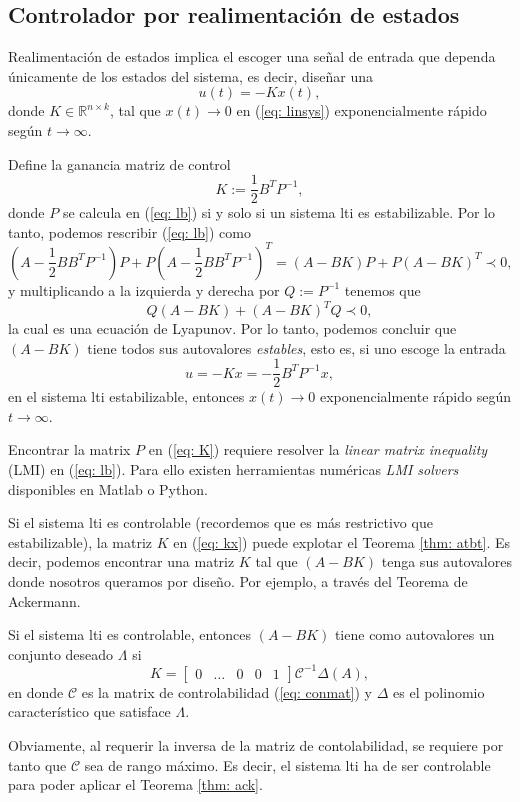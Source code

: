 \subsection{Controlador por realimentación de estados}
Realimentación de estados implica el escoger una señal de entrada que dependa únicamente de los estados del sistema, es decir, diseñar una
\begin{equation}
u(t) = -Kx(t),
	\label{eq: kx}
\end{equation}
donde $K\in\mathbb{R}^{n\times k}$, tal que $x(t) \to 0$ en (\ref{eq: linsys}) exponencialmente rápido según $t\to\infty$.

Define la ganancia matriz de control
\begin{equation}
	K:=\frac{1}{2}B^TP^{-1}, \label{eq: K}
\end{equation}
donde $P$ se calcula en (\ref{eq: lb}) si y solo si un sistema lti es estabilizable. Por lo tanto, podemos rescribir (\ref{eq: lb}) como
\begin{equation}
	(A - \frac{1}{2}BB^TP^{-1})P + P(A - \frac{1}{2}BB^TP^{-1})^T = (A-BK)P+P(A-BK)^T \prec 0,
\end{equation}
y multiplicando a la izquierda y derecha por $Q:=P^{-1}$ tenemos que
\begin{equation}
	Q(A-BK)+(A-BK)^TQ \prec 0,
\end{equation}
la cual es una ecuación de Lyapunov. Por lo tanto, podemos concluir que $(A-BK)$ tiene todos sus autovalores \emph{estables}, esto es, si uno escoge la entrada
\begin{equation}
	u = -Kx = -\frac{1}{2}B^TP^{-1}x, \label{eq: conK}
\end{equation}
en el sistema lti estabilizable, entonces $x(t) \to 0$ exponencialmente rápido según $t\to\infty$.

Encontrar la matrix $P$ en (\ref{eq: K}) requiere resolver la \emph{linear matrix inequality} (LMI) en (\ref{eq: lb}). Para ello existen herramientas numéricas \emph{LMI solvers} disponibles en Matlab o Python.

Si el sistema lti es controlable (recordemos que es más restrictivo que estabilizable), la matriz $K$ en (\ref{eq: kx}) puede explotar el Teorema \ref{thm: atbt}. Es decir, podemos encontrar una matriz $K$ tal que $(A-BK)$ tenga sus autovalores donde nosotros queramos por diseño. Por ejemplo, a través del Teorema de Ackermann.
\begin{theorem}
	\label{thm: ack}
	Si el sistema lti es controlable, entonces $(A-BK)$ tiene como autovalores un conjunto deseado $\Lambda$ si
	\begin{equation}
		K = \begin{bmatrix}0 & \dots & 0 & 0 & 1\end{bmatrix}\mathcal{C}^{-1} \Delta(A),
	\end{equation}
	en donde $\mathcal{C}$ es la matrix de controlabilidad (\ref{eq: conmat}) y $\Delta$ es el polinomio característico que satisface $\Lambda$.
\end{theorem}
Obviamente, al requerir la inversa de la matriz de contolabilidad, se requiere por tanto que $\mathcal{C}$ sea de rango máximo. Es decir, el sistema lti ha de ser controlable para poder aplicar el Teorema \ref{thm: ack}.


